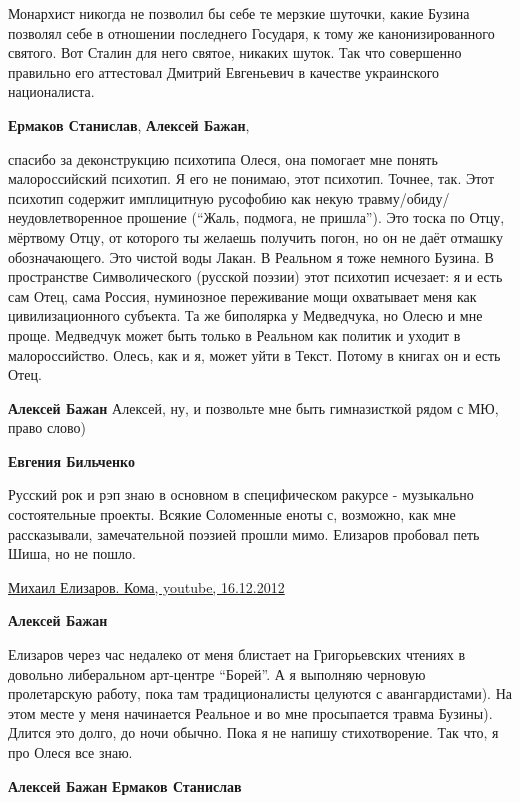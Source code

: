 \begin{itemize}
\begin{itemize}
Монархист никогда не позволил бы себе те мерзкие шуточки, какие Бузина позволял
себе в отношении последнего Государя, к тому же канонизированного святого. Вот
Сталин для него святое, никаких шуток. Так что совершенно правильно его
аттестовал Дмитрий Евгеньевич в качестве украинского националиста.

\textbf{Ермаков Станислав}, \textbf{Алексей Бажан}, 

спасибо за деконструкцию психотипа Олеся, она помогает мне понять
малороссийский психотип. Я его не понимаю, этот психотип. Точнее, так. Этот
психотип содержит имплицитную русофобию как некую
травму/обиду/неудовлетворенное прошение (\enquote{Жаль, подмога, не пришла}). Это тоска
по Отцу, мёртвому Отцу, от которого ты желаешь получить погон, но он не даёт
отмашку обозначающего. Это чистой воды Лакан. В Реальном я тоже немного Бузина.
В пространстве Символического (русской поэзии) этот психотип исчезает: я и есть
сам Отец, сама Россия, нуминозное переживание мощи охватывает меня как
цивилизационного субъекта. Та же биполярка у Медведчука, но Олесю и мне проще.
Медведчук может быть только в Реальном как политик и уходит в малороссийство.
Олесь, как и я, может уйти в Текст. Потому в книгах он и есть Отец.

\textbf{Алексей Бажан} Алексей, ну, и позвольте мне быть гимназисткой рядом с МЮ, право слово)

\textbf{Евгения Бильченко} 

Русский рок и рэп знаю в основном в специфическом ракурсе - музыкально
состоятельные проекты. Всякие Соломенные еноты с, возможно, как мне
рассказывали, замечательной поэзией прошли мимо. Елизаров пробовал петь Шиша,
но не пошло.

\href{https://www.youtube.com/watch?v=imeap-aSHWo}{%
Михаил Елизаров. Кома, youtube, 16.12.2012%
}

\textbf{Алексей Бажан} 

Елизаров через час недалеко от меня блистает на Григорьевских чтениях в
довольно либеральном арт-центре \enquote{Борей}. А я выполняю черновую пролетарскую
работу, пока там традиционалисты целуются с авангардистами). На этом месте у
меня начинается Реальное и во мне просыпается травма Бузины). Длится это долго,
до ночи обычно. Пока я не напишу стихотворение. Так что, я про Олеся все знаю.

\textbf{Алексей Бажан} \textbf{Ермаков Станислав} 


\end{itemize}
\end{itemize}
